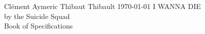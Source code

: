 
\begin{titlepage}
	Clément  Aymeric  Thibaut  Thibault  \hfill \today
	{\centering
		\vfill%
		\Huge I WANNA DIE
		\\[1cm]
		\small by the \Large Suicide Squad
		\\[1cm]
		\large Book of Specifications
		\vfill
	}
\end{titlepage}

\restoregeometry